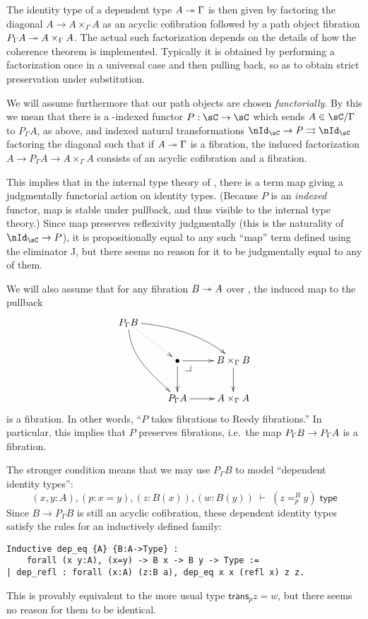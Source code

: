 \documentclass{amsart}
\begin{document}
The identity type of a dependent type $A\twoheadrightarrow \Gamma$ is then given by factoring the diagonal $A\to A\times_\Gamma A$ as an acyclic cofibration followed by a path object fibration $P_\Gamma A \twoheadrightarrow A\times_\Gamma A$.
The actual such factorization depends on the details of how the coherence theorem is implemented.
Typically it is obtained by performing a factorization once in a universal case and then pulling back, so as to obtain strict preservation under substitution.

We will assume furthermore that our path objects are chosen \emph{functorially}.
By this we mean that there is a \sC-indexed functor $P:\sC\to\sC$ which sends $A\in\sC/\Gamma$ to $P_\Gamma A$, as above, and indexed natural transformations $\nId_\sC \to P \toto \nId_\sC$ factoring the diagonal such that if $A\twoheadrightarrow\Gamma$ is a fibration, the induced factorization $A \to P_\Gamma A \to A\times_\Gamma A$ consists of an acyclic cofibration and a fibration.

This implies that in the internal type theory of \sC, there is a term \textsf{map} giving a judgmentally functorial action on identity types.
(Because $P$ is an \emph{indexed} functor, \textsf{map} is stable under pullback, and thus visible to the internal type theory.)
Since \textsf{map} preserves reflexivity judgmentally (this is the naturality of $\nId_\sC \to P$), it is propositionally equal to any such ``\textsf{map}'' term defined using the eliminator \textsf{J}, but there seems no reason for it to be judgmentally equal to any of them.

We will also assume that for any fibration $B\twoheadrightarrow A$ over \Gm, the induced map to the pullback
\begin{equation}
  \vcenter{\xymatrix{
      P_\Gm B \ar@{.>}[dr] \ar@(r,ul)[drr] \ar@(d,ul)[ddr]\\
      &\bullet\pullbackcorner \ar[r]\ar[d] &
      B\times_\Gm B\ar[d]\\
      &P_\Gm A\ar[r] &
      A\times_\Gm A
      }}
\end{equation}
is a fibration.
In other words, ``$P$ takes fibrations to Reedy fibrations.''
In particular, this implies that $P$ preserves fibrations, i.e.\ the map $P_\Gamma B \to P_\Gamma A$ is a fibration.

The stronger condition means that we may use $P_\Gamma B$ to model ``dependent identity types'':
\begin{equation}\label{eq:depeq}
  (x,y:A), (p:x=y), (z:B(x)), (w:B(y)) \;\vdash\; (z =_p^B y) \;\mathsf{type}
\end{equation}
Since $B \to P_\Gamma B$ is still an acyclic cofibration, these dependent identity types satisfy the rules for an inductively defined family:
\begin{verbatim}
Inductive dep_eq {A} {B:A->Type} :
    forall (x y:A), (x=y) -> B x -> B y -> Type :=
| dep_refl : forall (x:A) (z:B a), dep_eq x x (refl x) z z.
\end{verbatim}
This is provably equivalent to the more usual type $\mathsf{trans}_p z = w$, but there seems no reason for them to be identical.
\end{document}
